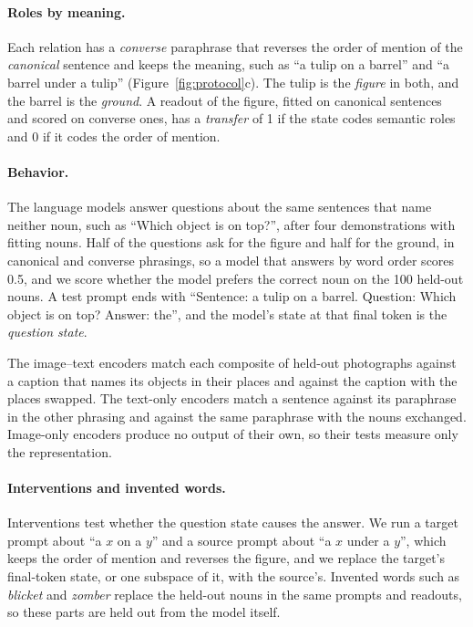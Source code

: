 \documentclass[10pt]{article}
\theoremstyle{plain}
\theoremstyle{remark}
\begin{document}
\paragraph{Roles by meaning.} Each relation has a \emph{converse} paraphrase that reverses the order of mention of the \emph{canonical} sentence and keeps the meaning, such as ``a tulip on a barrel'' and ``a barrel under a tulip'' (Figure~\ref{fig:protocol}c). The tulip is the \emph{figure} in both, and the barrel is the \emph{ground}. A readout of the figure, fitted on canonical sentences and scored on converse ones, has a \emph{transfer} of 1 if the state codes semantic roles and 0 if it codes the order of mention.

\paragraph{Behavior.} The language models answer questions about the same sentences that name neither noun, such as ``Which object is on top?'', after four demonstrations with fitting nouns. Half of the questions ask for the figure and half for the ground, in canonical and converse phrasings, so a model that answers by word order scores 0.5, and we score whether the model prefers the correct noun on the 100 held-out nouns. A test prompt ends with ``Sentence: a tulip on a barrel. Question: Which object is on top? Answer: the'', and the model's state at that final token is the \emph{question state}.

The image--text encoders match each composite of held-out photographs against a caption that names its objects in their places and against the caption with the places swapped. The text-only encoders match a sentence against its paraphrase in the other phrasing and against the same paraphrase with the nouns exchanged. Image-only encoders produce no output of their own, so their tests measure only the representation.

\paragraph{Interventions and invented words.} Interventions test whether the question state causes the answer. We run a target prompt about ``a $x$ on a $y$'' and a source prompt about ``a $x$ under a $y$'', which keeps the order of mention and reverses the figure, and we replace the target's final-token state, or one subspace of it, with the source's. Invented words such as \emph{blicket} and \emph{zomber} replace the held-out nouns in the same prompts and readouts, so these parts are held out from the model itself.
\end{document}
